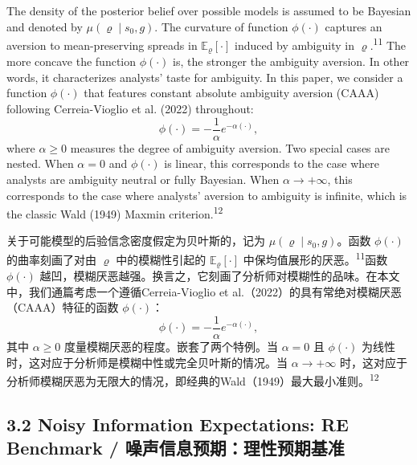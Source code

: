 \documentclass[12pt,a4paper]{article}
\newenvironment{original}
  {\par\medskip\noindent\ignorespaces}
  {\par\medskip}
\newenvironment{translation}
  {\par\noindent{\color{transblue}\ignorespaces}}
  {\par\bigskip}
\begin{document}
\begin{original}
The density of the posterior belief over possible models is assumed to be Bayesian and denoted by $\mu(\varrho \mid s_0, g)$. The curvature of function $\phi(\cdot)$ captures an aversion to mean-preserving spreads in $\mathbb{E}_{\varrho}[\cdot]$ induced by ambiguity in $\varrho$.\textsuperscript{11} The more concave the function $\phi(\cdot)$ is, the stronger the ambiguity aversion. In other words, it characterizes analysts' taste for ambiguity. In this paper, we consider a function $\phi(\cdot)$ that features constant absolute ambiguity aversion (CAAA) following Cerreia-Vioglio et al. (2022) throughout:
\[
\phi(\cdot) = -\frac{1}{\alpha} e^{-\alpha(\cdot)}, \tag{5}
\]
where $\alpha \geq 0$ measures the degree of ambiguity aversion. Two special cases are nested. When $\alpha = 0$ and $\phi(\cdot)$ is linear, this corresponds to the case where analysts are ambiguity neutral or fully Bayesian. When $\alpha \to +\infty$, this corresponds to the case where analysts' aversion to ambiguity is infinite, which is the classic Wald (1949) Maxmin criterion.\textsuperscript{12}
\end{original}
\begin{translation}
关于可能模型的后验信念密度假定为贝叶斯的，记为 $\mu(\varrho \mid s_0, g)$。函数 $\phi(\cdot)$ 的曲率刻画了对由 $\varrho$ 中的模糊性引起的 $\mathbb{E}_{\varrho}[\cdot]$ 中保均值展形的厌恶。\textsuperscript{11}函数 $\phi(\cdot)$ 越凹，模糊厌恶越强。换言之，它刻画了分析师对模糊性的品味。在本文中，我们通篇考虑一个遵循Cerreia-Vioglio et al.（2022）的具有常绝对模糊厌恶（CAAA）特征的函数 $\phi(\cdot)$：
\[
\phi(\cdot) = -\frac{1}{\alpha} e^{-\alpha(\cdot)}, \tag{5}
\]
其中 $\alpha \geq 0$ 度量模糊厌恶的程度。嵌套了两个特例。当 $\alpha = 0$ 且 $\phi(\cdot)$ 为线性时，这对应于分析师是模糊中性或完全贝叶斯的情况。当 $\alpha \to +\infty$ 时，这对应于分析师模糊厌恶为无限大的情况，即经典的Wald（1949）最大最小准则。\textsuperscript{12}
\end{translation}

\newpage
\subsection{3.2 Noisy Information Expectations: RE Benchmark / 噪声信息预期：理性预期基准}
\end{document}
